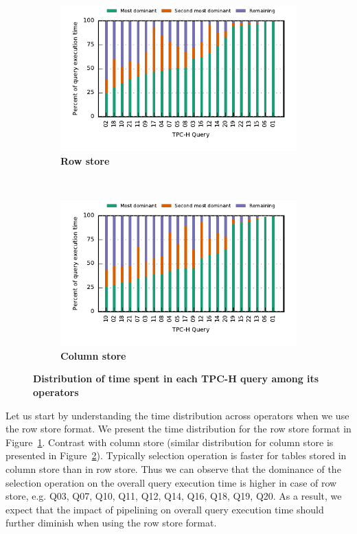 \begin{figure}[ht]
	\centering
	\begin{subfigure}[ht]{0.48\textwidth}
		\includegraphics{pipeline/figures/all-tpch-queries-time-distribution-rowstore}
		\caption{\textbf{Row store}}
		\label{fig:time-distribution-all-tpch-rowstore}
	\end{subfigure}
	~
	\begin{subfigure}[ht]{0.48\textwidth}
		\includegraphics{pipeline/figures/all-tpch-queries-time-distribution-withlip}
		\caption{\textbf{Column store}}
		\label{fig:time-distribution-all-tpch-colstore}
	\end{subfigure}
	\caption{\textbf{Distribution of time spent in each TPC-H query among its operators}}
	\label{fig:tpch-operator-time-distribution}
\end{figure}


Let us start by understanding the time distribution across operators when we use the row store format.
We present the time distribution for the row store format in Figure~\ref{fig:time-distribution-all-tpch-rowstore}.
Contrast with column store (similar distribution for column store is presented in Figure~\ref{fig:time-distribution-all-tpch-colstore}).
Typically selection operation is faster for tables stored in column store than in row store.
Thus we can observe that the dominance of the selection operation on the overall query execution time is higher in case of row store, e.g. Q03, Q07, Q10, Q11, Q12, Q14, Q16, Q18, Q19, Q20.
As a result, we expect that the impact of pipelining on overall query execution time should further diminish when using the row store format.

